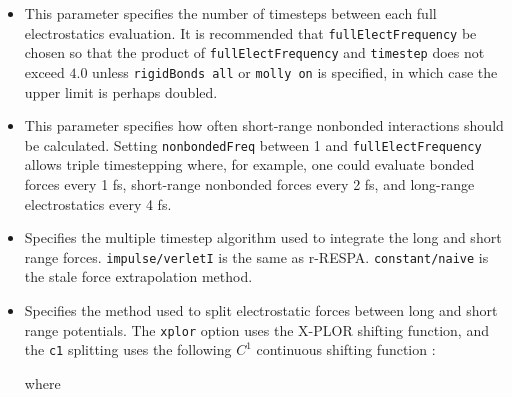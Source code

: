 \begin{itemize}

\item
{}
{This parameter specifies the number of timesteps between each full electrostatics evaluation.
It is recommended that {\tt fullElectFrequency} be chosen so that 
the product of {\tt fullElectFrequency} and {\tt timestep} does 
not exceed $4.0$ unless {\tt rigidBonds all} or {\tt molly on} is specified, 
in which case the upper limit is perhaps doubled.}

\item
{}
{This parameter specifies how often short-range nonbonded interactions should be calculated.  Setting {\tt nonbondedFreq} between 1 and {\tt fullElectFrequency} allows triple timestepping where, for example, one could evaluate bonded forces every 1 fs, short-range nonbonded forces every 2 fs, and long-range electrostatics every 4 fs.} 

\item
{}
{Specifies the multiple timestep algorithm used to integrate the 
long and short range forces.  {\tt impulse/verletI} is the same as r-RESPA.
{\tt constant/naive} is the stale force extrapolation method.}


\item
{}
{Specifies the method used to split electrostatic forces between long 
and short range potentials.  
The {\tt xplor} option uses the X-PLOR shifting function, 
and the {\tt c1} splitting uses 
the following $C^1$ continuous shifting 
function :  
}
where


\end{itemize}
